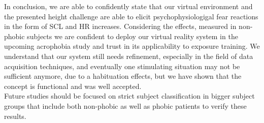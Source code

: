 

In conclusion, we are able to confidently state that our virtual environment and the presented height challenge are able to elicit psychophysiologigal fear reactions in the form of SCL and HR increases. Considering the effects, measured in non-phobic subjects we are confident to deploy our virtual reality system in the upcoming acrophobia study and trust in its applicability to exposure training. We understand that our system still needs refinement, especially in the field of data acquisition techniques, and eventually one stimulating situation may not be sufficient anymore, due to a habituation effects, but we have shown that the concept is functional and was well accepted.\\
Future studies should be focused on strict subject classification in bigger subject groups that include both non-phobic as well as phobic patients to verify these results.
